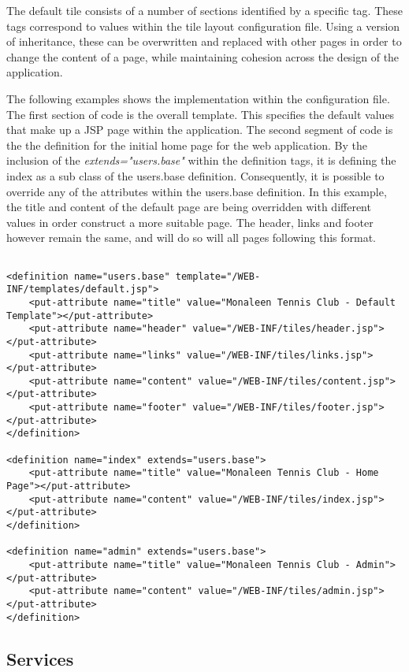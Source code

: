 The default tile consists of a number of sections identified by a specific tag. These tags correspond to values within the tile layout configuration file. Using a version of inheritance, these can be overwritten and replaced with other pages in order to change the content of a page, while maintaining cohesion across the design of the application. 

The following examples shows the implementation within the configuration file. The first section of code is the overall template. This specifies the default values that make up a JSP page within the application. The second segment of code is the the definition for the initial home page for the web application. By the inclusion of the \textit{extends="users.base"} within the definition tags, it is defining the index as a sub class of the users.base definition. Consequently, it is possible to override any of the attributes within the users.base definition. In this example, the title and content of the default page are being overridden with different values in order construct a more suitable page. The header, links and footer however remain the same, and will do so will all pages following this format.

\begin{lstlisting}

<definition name="users.base" template="/WEB-INF/templates/default.jsp">
	<put-attribute name="title" value="Monaleen Tennis Club - Default Template"></put-attribute>
	<put-attribute name="header" value="/WEB-INF/tiles/header.jsp"></put-attribute>
	<put-attribute name="links" value="/WEB-INF/tiles/links.jsp"></put-attribute>
	<put-attribute name="content" value="/WEB-INF/tiles/content.jsp"></put-attribute>
	<put-attribute name="footer" value="/WEB-INF/tiles/footer.jsp"></put-attribute>
</definition>

<definition name="index" extends="users.base">
	<put-attribute name="title" value="Monaleen Tennis Club - Home Page"></put-attribute>
	<put-attribute name="content" value="/WEB-INF/tiles/index.jsp"></put-attribute>
</definition>

<definition name="admin" extends="users.base">
	<put-attribute name="title" value="Monaleen Tennis Club - Admin"></put-attribute>
	<put-attribute name="content" value="/WEB-INF/tiles/admin.jsp"></put-attribute>
</definition>

\end{lstlisting}

\subsection{Services}

